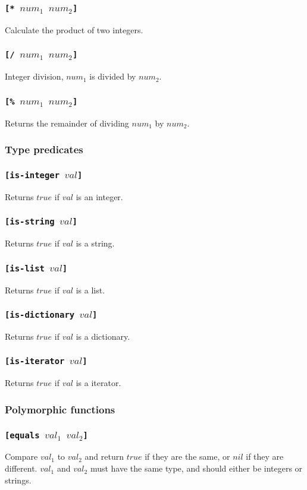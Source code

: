 \documentclass[11pt]{report}
\begin{document}
\subsubsection*{\tt{[* }$num_1$ $num_2$\tt{]}}
Calculate the product of two integers.
\subsubsection*{\tt{[/ }$num_1$ $num_2$\tt{]}}
Integer division, $num_1$ is divided by $num_2$.
\subsubsection*{\tt{[\% }$num_1$ $num_2$\tt{]}}
Returns the remainder of dividing $num_1$ by $num_2$.

\subsubsection{Type predicates}
\subsubsection*{\tt{[is-integer }$val$\tt{]}}
Returns $true$ if $val$ is an integer.
\subsubsection*{\tt{[is-string }$val$\tt{]}}
Returns $true$ if $val$ is a string.
\subsubsection*{\tt{[is-list }$val$\tt{]}}
Returns $true$ if $val$ is a list.
\subsubsection*{\tt{[is-dictionary }$val$\tt{]}}
Returns $true$ if $val$ is a dictionary.
\subsubsection*{\tt{[is-iterator }$val$\tt{]}}
Returns $true$ if $val$ is a iterator.

\subsubsection{Polymorphic functions}
\subsubsection*{\tt{[equals }$val_1$ $val_2$\tt{]}}
Compare $val_1$ to $val_2$ and return $true$ if they are the same, or $nil$ if they are different. $val_1$ and $val_2$ must have the same type, and should either be integers or strings.
\end{document}
